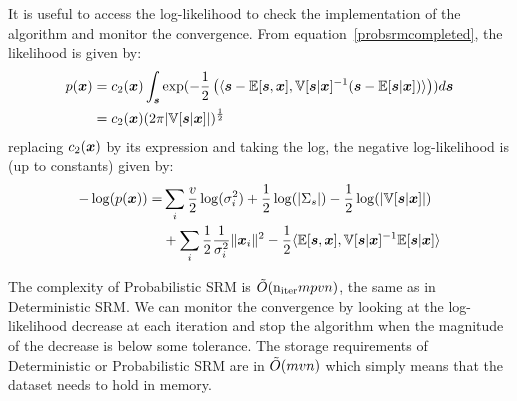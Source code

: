 It is useful to access the log-likelihood to check the implementation of the
algorithm and monitor the convergence. From equation~\eqref{probsrmcompleted},
the likelihood is given by:
\begin{align}
  p(\boldsymbol{x}) &= c_2(\boldsymbol{x}) \int_{\boldsymbol{s}} \exp(-\frac12 \left( \langle{  \boldsymbol{s}- \mathbb{E}[\boldsymbol{s}},{ \boldsymbol{x}], \mathbb{V}[\boldsymbol{s} | \boldsymbol{x}]^{-1} ( \boldsymbol{s} - \mathbb{E}[\boldsymbol{s} | \boldsymbol{x}])  }\rangle \right)) d\boldsymbol{s} \\
         &= c_2(\boldsymbol{x}) (2 \pi |\mathbb{V}[\boldsymbol{s} | \boldsymbol{x}]|)^{\frac12}
\end{align}
replacing $c_2(\boldsymbol{x})$ by its expression and taking the log, the negative
log-likelihood is (up to constants) given by:
\begin{align}
  -\log(p(\boldsymbol{x})) = &\sum_i \frac{v}{2} \log(\sigma_i^2) + \frac12 \log(|\Sigma_s|) - \frac12 \log(|\mathbb{V}[\boldsymbol{s} | \boldsymbol{x}]|) \\ &+ \sum_i
  \frac12 \frac1{\sigma_i^2}\|\boldsymbol{x}_i\|^2 - \frac12 \langle{  \mathbb{E}[\boldsymbol{s}},{ \boldsymbol{x}], \mathbb{V}[\boldsymbol{s} | \boldsymbol{x}]^{-1} \mathbb{E}[\boldsymbol{s} | \boldsymbol{x}] }\rangle
\end{align}

The complexity of Probabilistic SRM is $\tilde{O}(\mathrm{n_{iter}} mpvn)$, the same as in
Deterministic SRM.
We can monitor the convergence by looking at the log-likelihood decrease at each iteration
and stop the algorithm when the magnitude of the decrease is below some
tolerance.
The storage requirements of Deterministic or Probabilistic SRM are in
$\tilde{O}(mvn)$ which simply means that the dataset needs to hold in memory.





